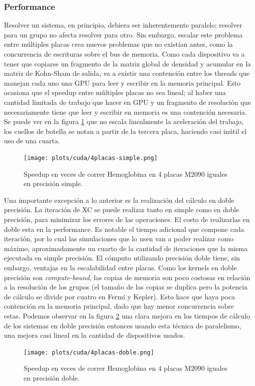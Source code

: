 \subsubsection{Performance}
\label{cuda-multiplaca}

Resolver un sistema, en principio, debiera ser inherentemente paralelo; resolver para un grupo
no afecta resolver para otro. Sin embargo, escalar este problema entre m\'ultiples placas crea
nuevos problemas que no exist\'ian antes, como la concurrencia de escrituras sobre el bus de memoria.
Como cada dispositivo va a tener que copiarse un fragmento de la matriz global de densidad
y acumular en la matriz de Kohn-Sham de salida, va a existir una contenci\'on entre los threads que manejan
cada uno una GPU para leer y escribir en la memoria principal. Esto ocasiona que el speedup entre
m\'ultiples placas no sea lineal; al haber una cantidad limitada de trabajo que hacer en GPU y un fragmento de
resoluci\'on que necesariamente tiene que leer y escribir en memoria es una contenci\'on necesaria. Se puede
ver en la figura \ref{fig:4placas-simple} que no escala linealmente la aceleraci\'on del trabajo, los cuellos
de botella se notan a partir de la tercera placa, haciendo casi in\'util el uso de una cuarta.

\begin{figure}[htbp]
   \centering
   \texttt{[image: plots/cuda/4placas-simple.png]}
   \caption{Speedup en veces de correr Hemoglobina en 4 placas M2090 iguales en precisi\'on simple.}
   \label{fig:4placas-simple}
\end{figure}

Una importante excepci\'on a lo anterior es la realizaci\'on del c\'alculo en doble precisi\'on. La iteraci\'on
de XC se puede realizar tanto en simple como en doble precisi\'on, para minimizar los
errores de las operaciones. El costo de realizarlas en doble esta en la performance. Es notable
el tiempo adicional que compone cada iteraci\'on, por lo cual las simulaciones que lo usen van
a poder realizar como m\'aximo, aproximadamente un cuarto de la cantidad de iteraciones que la misma ejecutada en simple precisi\'on.
El c\'omputo utilizando precisi\'on doble tiene, sin embargo, ventajas en la escalabilidad entre placas.
Como los kernels en doble precisi\'on son \textit{compute-bound}, las copias de memoria son poco costosas
en relaci\'on a la resoluci\'on de los grupos (el tama\~no de las copias se duplica pero la potencia de c\'alculo se divide
por cuatro en Fermi y Kepler). Esto hace que haya poca contenci\'on en la memoria principal,
dado que hay menor concurrencia sobre estas. Podemos observar en la figura \ref{fig:4placas-doble} una clara mejora en los tiempos
de c\'alculo de los sistemas en doble precisi\'on entonces usando esta t\'ecnica de paralelismo, una mejora casi
lineal en la cantidad de dispositivos usados.

\begin{figure}[htbp]
   \centering
   \texttt{[image: plots/cuda/4placas-doble.png]}
   \caption{Speedup en veces de correr Hemoglobina en 4 placas M2090 iguales en precisi\'on doble.}
   \label{fig:4placas-doble}
\end{figure}


